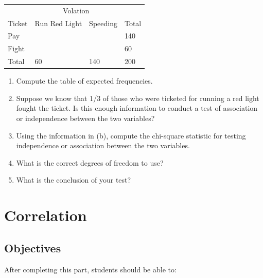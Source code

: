 \documentclass[11pt, chapterprefix=true]{scrbook}\usepackage[]{graphicx}\usepackage[]{color}
\begin{document}
\begin{exercises}
\begin{exercise}
\begin{table}[ht]
\centering
\begin{tabular}{@{} llll @{}} \hline
& \multicolumn{2}{c}{Volation} \\
Ticket & Run Red Light & Speeding & Total \\ \hline
Pay  &  &   & 140 \\
Fight   &  &  & 60  \\ \hline
Total & 60 & 140 & 200 \\ \hline
\end{tabular}
\end{table}

\begin{enumerate}
  \item Compute the table of expected frequencies.
  \item Suppose we know that 1/3 of those who were ticketed for running a red light \\ fought the ticket.  Is this enough information to conduct a test of association or independence between the two variables?
  \item Using the information in (b), compute the chi-square statistic for testing independence or association between the two variables.
  \item What is the correct degrees of freedom to use?
  \item What is the conclusion of your test?
\end{enumerate}

\end{exercise}
\begin{solution} %

\end{solution}
\end{exercises}

\onecolumn



\chapter{Correlation}
\label{chap:ch15}

\section{Objectives}

After completing this part, students should be able to:
\end{document}
